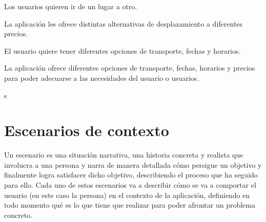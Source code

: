 \vspace{0.5cm}

\begin{problema}

      Los usuarios quieren ir de un lugar a otro.

            {\centering
                  \begin{vision}\justifying\noindent
                        La aplicación les ofrece distintas alternativas de desplazamiento a diferentes precios.
                  \end{vision}}
\end{problema}

\vspace{0.5cm}

\begin{problema}

      El usuario quiere tener diferentes opciones de transporte, fechas y horarios.

            {\centering
                  \begin{vision}\justifying\noindent
                        La aplicación ofrece diferentes opciones de transporte, fechas, horarios y precios para poder adecuarse a las necesidades del usuario o usuarios.
                  \end{vision}}
\end{problema}

\vspace{0.5cm}
s
\section{Escenarios de contexto}
Un escenario es una situación narrativa, una historia concreta y realista que
involucra a una persona y narra de manera detallada cómo persigue un objetivo y
finalmente logra satisfacer dicho objetivo, describiendo el proceso que ha
seguido para ello. Cada uno de estos escenarios va a describir cómo se va a
comportar el usuario (en este caso la persona) en el contexto de la aplicación,
definiendo en todo momento qué es lo que tiene que realizar para poder afrontar
un problema concreto.
